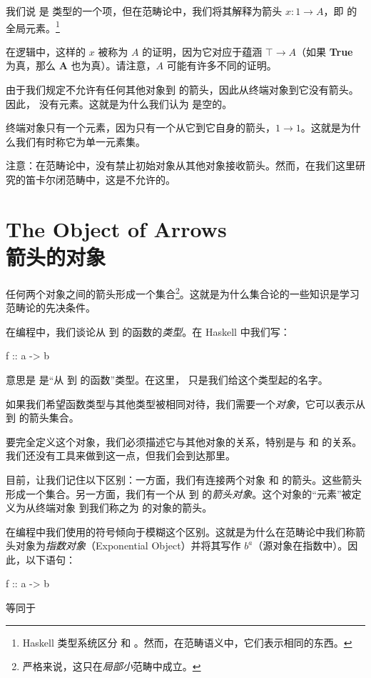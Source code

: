 \documentclass[DaoFP]{subfiles}
\begin{document}
 我们说  是  类型的一个项，但在范畴论中，我们将其解释为箭头 $x : 1 \to A$，即  的全局元素。\footnote{Haskell 类型系统区分  和 。然而，在范畴语义中，它们表示相同的东西。}

 在逻辑中，这样的 $x$ 被称为 $A$ 的证明，因为它对应于蕴涵 $ \top \to A$（如果 \textbf{True} 为真，那么 \textbf{A} 也为真）。请注意，$A$ 可能有许多不同的证明。

 由于我们规定不允许有任何其他对象到  的箭头，因此从终端对象到它没有箭头。因此， 没有元素。这就是为什么我们认为  是空的。

 终端对象只有一个元素，因为只有一个从它到它自身的箭头，$1 \to 1$。这就是为什么我们有时称它为单一元素集。

 注意：在范畴论中，没有禁止初始对象从其他对象接收箭头。然而，在我们这里研究的笛卡尔闭范畴中，这是不允许的。

 \section{The Object of Arrows\\箭头的对象}

 任何两个对象之间的箭头形成一个集合\footnote{严格来说，这只在\emph{局部小}范畴中成立。}。这就是为什么集合论的一些知识是学习范畴论的先决条件。

 在编程中，我们谈论从  到  的函数的\emph{类型}。在 Haskell 中我们写：
 \begin{haskell}
  f :: a -> b
 \end{haskell}
 意思是  是“从  到  的函数”类型。在这里， 只是我们给这个类型起的名字。

 如果我们希望函数类型与其他类型被相同对待，我们需要一个\emph{对象}，它可以表示从  到  的箭头集合。

 要完全定义这个对象，我们必须描述它与其他对象的关系，特别是与  和  的关系。我们还没有工具来做到这一点，但我们会到达那里。

 目前，让我们记住以下区别：一方面，我们有连接两个对象  和  的箭头。这些箭头形成一个集合。另一方面，我们有一个从  到  的\emph{箭头对象}。这个对象的“元素”被定义为从终端对象 \hask{()} 到我们称之为  的对象的箭头。

 在编程中我们使用的符号倾向于模糊这个区别。这就是为什么在范畴论中我们称箭头对象为\emph{指数对象}（Exponential Object）并将其写作 $b^a$（源对象在指数中）。因此，以下语句：
 \begin{haskell}
  f :: a -> b
 \end{haskell}
 等同于
\end{document}
